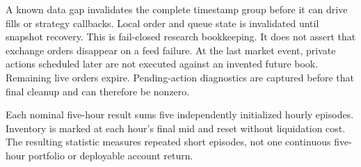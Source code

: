 A known data gap invalidates the complete timestamp group before it can drive
fills or strategy callbacks. Local order and queue state is invalidated until
snapshot recovery. This is fail-closed research bookkeeping. It does not assert
that exchange orders disappear on a feed failure. At the last market event,
private actions scheduled later are not executed against an invented future
book. Remaining live orders expire. Pending-action diagnostics are captured
before that final cleanup and can therefore be nonzero.

Each nominal five-hour result sums five independently initialized hourly
episodes. Inventory is marked at each hour's final mid and reset without
liquidation cost. The resulting statistic measures repeated short episodes,
not one continuous five-hour portfolio or deployable account return.
